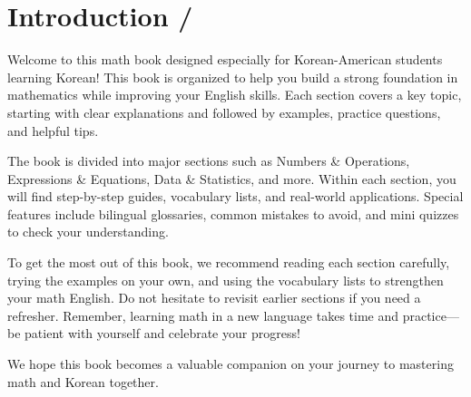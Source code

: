\newpage
\section*{Introduction / }
Welcome to this math book designed especially for Korean-American students learning Korean!
This book is organized to help you build a strong foundation in mathematics while
improving your English skills. Each section covers a key topic, starting with clear
explanations and followed by examples, practice questions, and helpful tips.

The book is divided into major sections such as Numbers \& Operations, Expressions
\& Equations,
Data \& Statistics, and more. Within each section, you will find step-by-step guides,
vocabulary lists, and real-world applications. Special features include bilingual
glossaries, common mistakes to avoid, and mini quizzes to check your understanding.

To get the most out of this book, we recommend reading each section carefully,
trying the examples on your own, and using the vocabulary lists to strengthen
your math English. Do not hesitate to revisit earlier sections if you need a
refresher. Remember, learning math in a new language takes time and practice—be
patient with yourself and celebrate your progress!

We hope this book becomes a valuable companion on your journey to mastering math
and Korean together.




